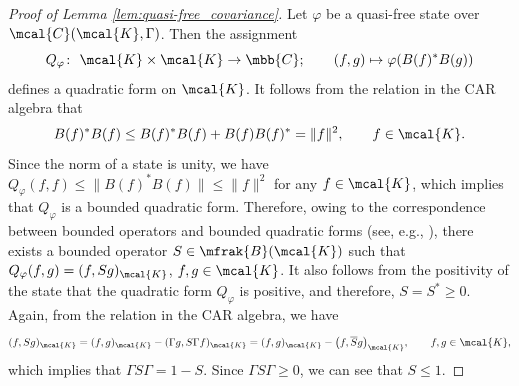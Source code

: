 \begin{proof}[Proof of Lemma \ref{lem:quasi-free_covariance}]
Let $\varphi$ be a quasi-free state over $\mcal{C}(\mcal{K},\Gamma)$.
Then the assignment
\begin{equation*}
	Q_{\varphi}\colon \ \mcal{K}\times \mcal{K}\to\mbb{C};\qquad (f,g)\mapsto \varphi (B(f)^{\ast}B(g))
\end{equation*}
defines a quadratic form on $\mcal{K}$.
It follows from the relation in the CAR algebra that
\begin{equation*}
	B(f)^{\ast}B(f)\le B(f)^{\ast}B(f)+B(f)B(f)^{\ast}=\|f\|^{2},\qquad f\in\mcal{K}.
\end{equation*}
Since the norm of a state is unity, we have $Q_{\varphi}(f,f)\le \|B(f)^{\ast}B(f)\|\le \|f\|^{2}$ for any $f\in\mcal{K}$, which implies that $Q_{\varphi}$ is a bounded quadratic form. Therefore, owing to the correspondence between bounded operators and bounded quadratic forms (see, e.g., \cite[Chapter~1]{Koshmanenko1999}), there exists a bounded operator $S\in \mfrak{B}(\mcal{K})$ such that $Q_{\varphi}(f,g)=(f,Sg)_{\mcal{K}}$, $f,g \in \mcal{K}$. It also follows from the positivity of the state that the quadratic form $Q_{\varphi}$ is positive, and therefore, $S=S^{\ast}\ge 0$. Again, from the relation in the CAR algebra, we have
\begin{equation*}
	(f,Sg)_{\mcal{K}}=(f,g)_{\mcal{K}}-(\Gamma g, S\Gamma f)_{\mcal{K}}=(f,g)_{\mcal{K}}-\big(f,\overline{S} g\big)_{\mcal{K}},\qquad f,g\in\mcal{K},
\end{equation*}
which implies that $\Gamma S \Gamma=1-S$. Since $\Gamma S \Gamma\ge 0$, we can see that $S\le 1$.


\end{proof}
